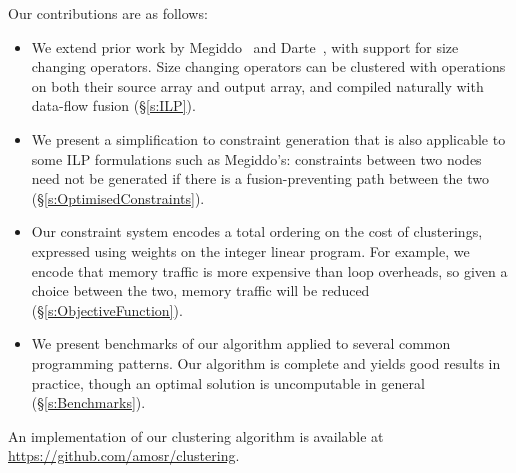 Our contributions are as follows:
\begin{itemize}
\item   
We extend prior work by Megiddo~\cite{megiddo1998optimal} and Darte~\cite{darte2002contraction}, with support for size changing operators.
Size changing operators can be clustered with operations on both their source array and output array, and compiled naturally with data-flow fusion (\S\ref{s:ILP}).

\item
We present a simplification to constraint generation that is also applicable to some ILP formulations such as Megiddo's:
constraints between two nodes need not be generated if there is a fusion-preventing path between the two (\S\ref{s:OptimisedConstraints}).

\item
Our constraint system encodes a total ordering on the cost of clusterings, expressed using weights on the integer linear program.
For example, we encode that memory traffic is more expensive than loop overheads, so given a choice between the two, memory traffic will be reduced (\S\ref{s:ObjectiveFunction}).

\item
We present benchmarks of our algorithm applied to several common programming patterns.
Our algorithm is complete and yields good results in practice, though an optimal solution is uncomputable in general (\S\ref{s:Benchmarks}).
\end{itemize}

An implementation of our clustering algorithm is available at \url{https://github.com/amosr/clustering}.



